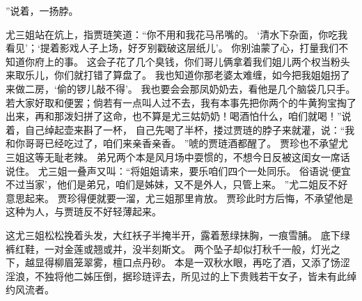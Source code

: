 ”说着，一扬脖。
\par
尤三姐站在炕上，指贾琏笑道：“你不用和我花马吊嘴的。
‘清水下杂面，你吃我看见’；‘提着影戏人子上场，好歹别戳破这层纸儿’。
你别油蒙了心，打量我们不知道你府上的事。
这会子花了几个臭钱，你们哥儿俩拿着我们姐儿两个权当粉头来取乐儿，你们就打错了算盘了。
我也知道你那老婆太难缠，如今把我姐姐拐了来做二房，‘偷的锣儿敲不得’。
我也要会会那凤奶奶去，看他是几个脑袋几只手。
若大家好取和便罢；倘若有一点叫人过不去，我有本事先把你两个的牛黄狗宝掏了出来，再和那泼妇拼了这命，也不算是尤三姑奶奶！喝酒怕什么，咱们就喝！”说着，自己绰起壶来斟了一杯，
自己先喝了半杯，搂过贾琏的脖子来就灌，说：“我和你哥哥已经吃过了，咱们来亲香亲香。
”唬的贾琏酒都醒了。
贾珍也不承望尤三姐这等无耻老辣。
弟兄两个本是风月场中耍惯的，不想今日反被这闺女一席话说住。
尤三姐一叠声又叫：“将姐姐请来，要乐咱们四个一处同乐。
俗语说‘便宜不过当家’，他们是弟兄，咱们是姊妹，又不是外人，只管上来。
”尤二姐反不好意思起来。
贾珍得便就要一溜，尤三姐那里肯放。
贾珍此时方后悔，不承望他是这种为人，与贾琏反不好轻薄起来。
\par
这尤三姐松松挽着头发，大红袄子半掩半开，露着葱绿抹胸，一痕雪脯。
底下绿裤红鞋，一对金莲或翘或并，没半刻斯文。
两个坠子却似打秋千一般，灯光之下，越显得柳眉笼翠雾，檀口点丹砂。
本是一双秋水眼，再吃了酒，又添了饧涩淫浪，不独将他二姊压倒，据珍琏评去，所见过的上下贵贱若干女子，皆未有此绰约风流者。
